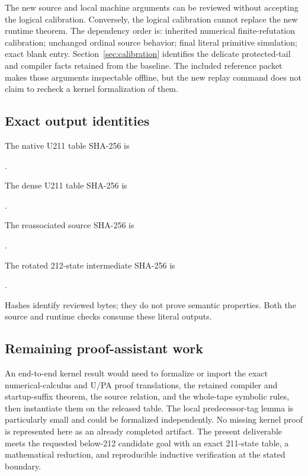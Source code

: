 The new source and local machine arguments can be reviewed without accepting
the logical calibration. Conversely, the logical calibration cannot replace
the new runtime theorem. The dependency order is: inherited numerical
finite-refutation calibration; unchanged ordinal source behavior; final
literal primitive simulation; exact blank entry. Section~\ref{sec:calibration}
identifies the delicate protected-tail and compiler facts retained from the
baseline. The included reference packet makes those arguments inspectable
offline, but the new replay command does not claim to recheck a kernel
formalization of them.

\subsection{Exact output identities}

\begin{samepage}
The native U211 table SHA-256 is
\begin{center}\small
{}.
\end{center}
\end{samepage}
\begin{samepage}
The dense U211 table SHA-256 is
\begin{center}\small
{}.
\end{center}
\end{samepage}
\begin{samepage}
The reassociated source SHA-256 is
\begin{center}\small
{}.
\end{center}
\end{samepage}
\begin{samepage}
The rotated 212-state intermediate SHA-256 is
\begin{center}\small
{}.
\end{center}
\end{samepage}
Hashes identify reviewed bytes; they do not prove semantic properties.
Both the source and runtime checks consume these literal outputs.

\subsection{Remaining proof-assistant work}

An end-to-end kernel result would need to formalize or import the exact
numerical-calculus and U/PA proof translations, the retained compiler and
startup-suffix theorem, the source relation, and the whole-tape symbolic
rules, then instantiate them on the released table. The local predecessor-tag
lemma is particularly small and could be formalized independently. No
missing kernel proof is represented here as an already completed artifact.
The present deliverable meets the requested below-212 candidate goal with
an exact 211-state table, a mathematical reduction, and reproducible
inductive verification at the stated boundary.
